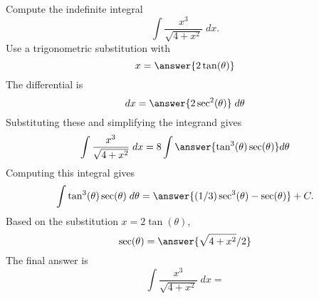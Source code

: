 \documentclass{ximera}
\begin{document}
\begin{problem}
Compute the indefinite integral
\[
\int \frac{x^3}{\sqrt{4 + x^2}} \; dx.
\]
Use a trigonometric substitution with\\
\[
x = \answer{2\tan(\theta)}
\]
The differential is\\
\[
dx = \answer{2\sec^2(\theta)} \; d\theta
\]
Substituting these and simplifying the integrand gives\\
\[
\int \frac{x^3}{\sqrt{4 + x^2}} \; dx = 8\int \answer{\tan^3(\theta)\sec(\theta)} d\theta
\]
Computing this integral gives
\[
\int \tan^3(\theta)\sec(\theta) \; d\theta = \answer{(1/3)\sec^3(\theta) - \sec(\theta)} + C.
\]
Based on the substitution $x = 2\tan(\theta)$, \\
\[
\sec(\theta) = \answer{\sqrt{4+x^2}/2}
\]
The final answer is
\[
\int  \frac{x^3}{\sqrt{4 + x^2}} \; dx = 
\]
\begin{center}
\begin{multipleChoice}
\end{multipleChoice}
\end{center}
\end{problem}
\end{document}
